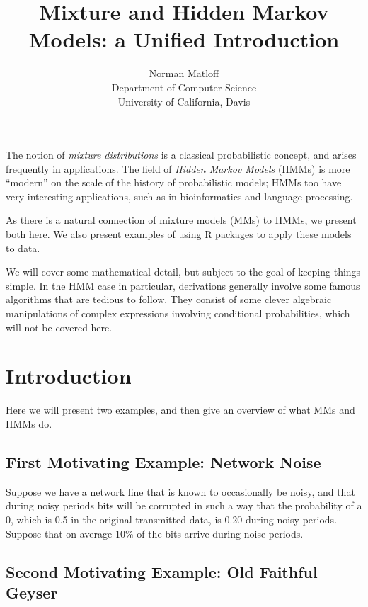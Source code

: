 \documentclass[11pt]{article}
\begin{document}
 

\title{Mixture and Hidden Markov Models: a Unified Introduction}
\author{Norman Matloff \\
   Department of Computer Science \\
   University of California, Davis}

\maketitle

The notion of \textit{mixture distributions} is a classical
probabilistic concept, and arises frequently in applications.  The field
of \textit{Hidden Markov Models} (HMMs) is more ``modern'' on the scale
of the history of probabilistic models; HMMs too have very interesting
applications, such as in bioinformatics and language processing.

As there is a natural connection of mixture models (MMs) to HMMs, we
present both here.  We also present examples of using R packages to
apply these models to data.

We will cover some mathematical detail, but subject to the goal of
keeping things simple.  In the HMM case in particular, derivations
generally involve some famous algorithms that are tedious to follow.
They consist of some clever algebraic manipulations of complex
expressions involving conditional probabilities, which will not be
covered here.

\section{Introduction}

Here we will present two examples, and then give an overview of what MMs
and HMMs do.

\subsection{First Motivating Example:  Network Noise}

Suppose we have a network line that is known to occasionally be
noisy, and that during noisy periods bits will be corrupted in such
a way that the probability of a 0, which is 0.5 in the original
transmitted data, is 0.20 during noisy periods.  Suppose that on average
10\% of the bits arrive during noise periods.

\subsection{Second Motivating Example:  Old Faithful Geyser}
\end{document}
